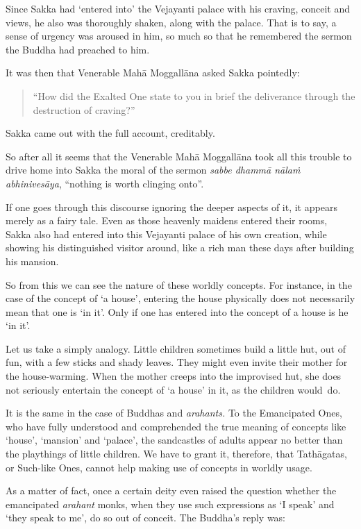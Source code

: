 Since Sakka had `entered into' the Vejayanti palace with his craving, conceit and views, he also was thoroughly shaken, along with the palace. That is to say, a sense of urgency was aroused in him, so much so that he remembered the sermon the Buddha had preached to him.

\clearpage

It was then that Venerable Mahā Moggallāna asked Sakka pointedly:

\begin{quote}
``How did the Exalted One state to you in brief the deliverance through the destruction of craving?''
\end{quote}

Sakka came out with the full account, creditably.

So after all it seems that the Venerable Mahā Moggallāna took all this trouble to drive home into Sakka the moral of the sermon \emph{sabbe dhammā nālaṁ abhinivesāya}, ``nothing is worth clinging onto''.

If one goes through this discourse ignoring the deeper aspects of it, it appears merely as a fairy tale. Even as those heavenly maidens entered their rooms, Sakka also had entered into this Vejayanti palace of his own creation, while showing his distinguished visitor around, like a rich man these days after building his mansion.

So from this we can see the nature of these worldly concepts. For instance, in the case of the concept of `a house', entering the house physically does not necessarily mean that one is `in it'. Only if one has entered into the concept of a house is he `in it'.

Let us take a simply analogy. Little children sometimes build a little hut, out of fun, with a few sticks and shady leaves. They might even invite their mother for the house-warming. When the mother creeps into the improvised hut, she does not seriously entertain the concept of `a house' in it, as the children would~do.

It is the same in the case of Buddhas and \emph{arahants.} To the Emancipated Ones, who have fully understood and comprehended the true meaning of concepts like `house', `mansion' and `palace', the sandcastles of adults appear no better than the playthings of little children. We have to grant it, therefore, that Tathāgatas, or Such-like Ones, cannot help making use of concepts in worldly usage.

As a matter of fact, once a certain deity even raised the question whether the emancipated \emph{arahant} monks, when they use such expressions as `I speak' and `they speak to me', do so out of conceit. The Buddha's reply was:

